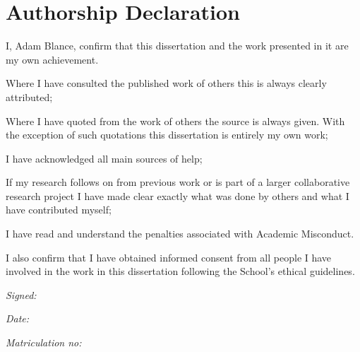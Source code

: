 
\section*{Authorship Declaration}
\vspace{0.5cm}
\begin{flushleft}
I, Adam Blance, confirm that this dissertation and the work presented in it are my own achievement.\newline

Where I have consulted the published work of others this is always clearly attributed;\newline

Where I have quoted from the work of others the source is always given. With the exception of such quotations this dissertation is entirely my own work;\newline

I have acknowledged all main sources of help; \newline

If my research follows on from previous work or is part of a larger collaborative research project I have made clear exactly what was done by others and what I have contributed myself;\newline

I have read and understand the penalties associated with Academic Misconduct.\newline

I also confirm that I have obtained informed consent from all people I have involved in the work in this dissertation following the School's ethical guidelines.\newline
\end{flushleft}

\begin{flushleft} \large
\emph{Signed:} \\
\end{flushleft}

\vspace{.5cm}

\begin{flushleft} \large
\emph{Date:} \\
\end{flushleft}

\vspace{.5cm}

\begin{flushleft} \large
\emph{Matriculation no: }  \\
\end{flushleft}